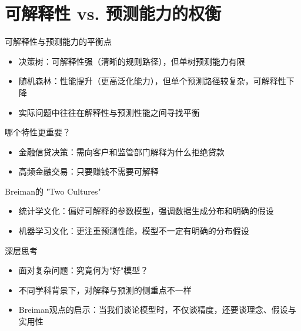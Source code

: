 \documentclass{beamer}
\begin{document}
\section{可解释性 vs. 预测能力的权衡}

\begin{frame}{可解释性与预测能力的平衡点}
  \begin{itemize}
    \item 决策树：可解释性强（清晰的规则路径），但单树预测能力有限
    \item 随机森林：性能提升（更高泛化能力），但单个预测路径较复杂，可解释性下降
    \item 实际问题中往往在解释性与预测性能之间寻找平衡
  \end{itemize}
\end{frame}

\begin{frame}{哪个特性更重要？}
  \begin{itemize}
    \item 金融信贷决策：需向客户和监管部门解释为什么拒绝贷款
    \item 高频金融交易：只要赚钱不需要可解释
  \end{itemize}
\end{frame}

\begin{frame}{Breiman的 "Two Cultures" }
  \begin{itemize}[<+->]
    \item 统计学文化：偏好可解释的参数模型，强调数据生成分布和明确的假设
    \item 机器学习文化：更注重预测性能，模型不一定有明确的分布假设
  \end{itemize}
\end{frame}

\begin{frame}{深层思考}
  \begin{itemize}[<+->]
    \item 面对复杂问题：究竟何为"好"模型？  
    \item 不同学科背景下，对解释与预测的侧重点不一样
    \item Breiman观点的启示：当我们谈论模型时，不仅谈精度，还要谈理念、假设与实用性
  \end{itemize}
\end{frame}
\end{document}
